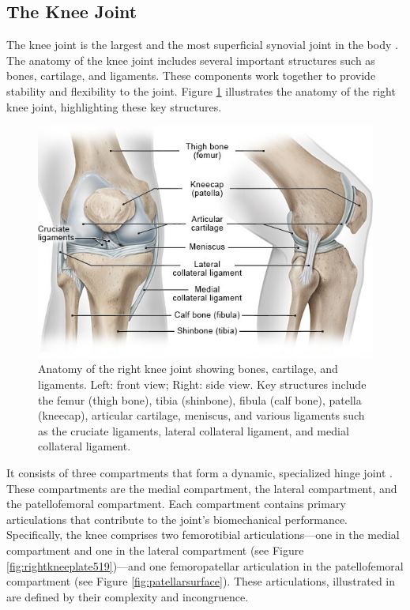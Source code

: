 \documentclass{micro-econ-thesis}
\begin{document}
\subsection{The Knee Joint }

The knee joint is the largest and the most superficial synovial joint in the body \parencite{dalley_moores_2023}. The anatomy of the knee joint includes several important structures such as bones, cartilage, and ligaments. These components work together to provide stability and flexibility to the joint. Figure \ref{fig:kniearthrosekniegelenk-anatomieenjpg} illustrates the anatomy of the right knee joint, highlighting these key structures.
\begin{figure}[H]
	\centering
	\includegraphics[width=0.7\linewidth]{kniearthrose_kniegelenk-anatomie_enjpg}
	\caption{Anatomy of the right knee joint showing bones, cartilage, and ligaments. Left: front view; Right: side view. Key structures include the femur (thigh bone), tibia (shinbone), fibula (calf bone), patella (kneecap), articular cartilage, meniscus, and various ligaments such as the cruciate ligaments, lateral collateral ligament, and medial collateral ligament. \parencite{informedhealth2021}}
	\label{fig:kniearthrosekniegelenk-anatomieenjpg}
\end{figure}

 
It consists of three compartments that form a dynamic, specialized hinge joint \parencite[p.1395]{standring_grays_2021}. These compartments are the medial compartment, the lateral compartment, and the patellofemoral compartment.
Each compartment contains primary articulations that contribute to the joint's biomechanical performance. Specifically, the knee comprises two femorotibial articulations—one in the medial compartment and one in the lateral compartment (see Figure \ref{fig:rightkneeplate519})—and one femoropatellar articulation in the patellofemoral compartment (see Figure \ref{fig:patellarsurface}).  These articulations, illustrated in  are defined by their complexity and incongruence. 
 
\end{document}
